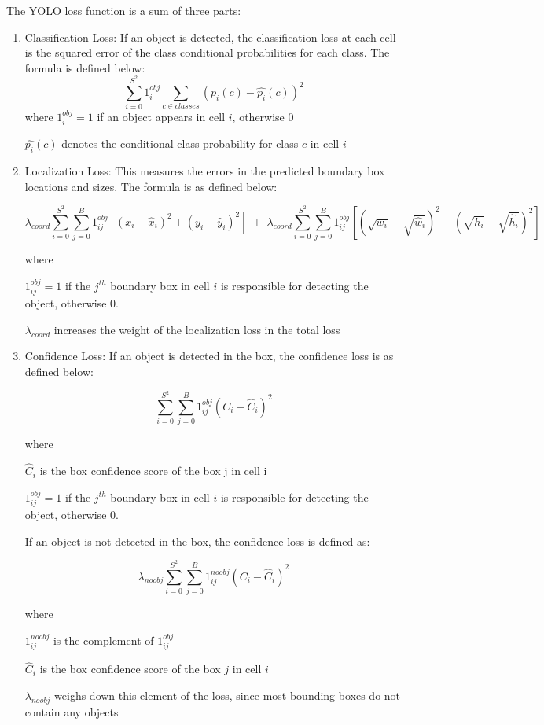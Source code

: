 \documentclass[12pt,letterpaper]{article}
\begin{document}
The YOLO loss function is a sum of three parts:

\begin{enumerate}
    \item Classification Loss: If an object is detected, the classification loss at each cell is the squared error of the class conditional probabilities for each class. The formula is defined below:
        \[ \sum_{i=0}^{S^2} 1_{i}^{obj} \sum_{c \in classes} (p_{i}(c)-\widehat{p_{i}}(c))^2 \] 
    where $1_{i}^{obj} = 1$ if an object appears in cell $i$, otherwise 0

    $\widehat{p_{i}}(c)$ denotes the conditional class probability for class $c$ in cell $i$

\item Localization Loss: This measures the errors in the predicted boundary box locations and sizes. The formula is as defined below:
    
    \[ \lambda_{coord}\sum_{i=0}^{S^2} \sum_{j=0}^{B} 1_{ij}^{obj} [(x_{i} - \widehat{x}_{i})^2 + (y_{i} - \widehat{y}_{i})^2]\; + \; \lambda_{coord}\sum_{i=0}^{S^2} \sum_{j=0}^{B}1_{ij}^{obj}[(\sqrt{w_{i}} - \sqrt{\widehat{w}_{i}})^2 + (\sqrt{h_{i}} - \sqrt{\widehat{h}_{i}})^2 ]    \]

where

$1_{ij}^{obj} = 1$ if the $j^{th}$ boundary box in cell $i$ is responsible for detecting the object, otherwise 0.

$\lambda_{coord}$ increases the weight of the localization loss in the total loss


\item Confidence Loss: If an object is detected in the box, the confidence loss is as defined below:

    \[ \sum_{i=0}^{S^2} \sum_{j=0}^{B} 1_{ij}^{obj} (C_{i} - \widehat{C}_{i})^2 \]

    where

    $\widehat{C}_{i}$ is the box confidence score of the box j in cell i

    $1_{ij}^{obj} = 1$ if the $j^{th}$ boundary box in cell $i$ is responsible for detecting the object, otherwise 0.

    If an object is not detected in the box, the confidence loss is defined as:

    \[ \lambda_{noobj} \sum_{i=0}^{S^2} \sum_{j=0}^{B} 1_{ij}^{noobj} (C_{i} - \widehat{C}_{i})^2  \]

    where

    $1_{ij}^{noobj}$ is the complement of $1_{ij}^{obj}$

    $\widehat{C}_{i}$ is the box confidence score of the box $j$ in cell $i$

    $\lambda_{noobj}$ weighs down this element of the loss, since most bounding boxes do not contain any objects

\end{enumerate}
\end{document}
